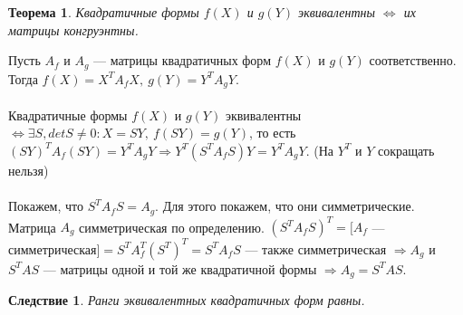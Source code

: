 \newtheorem*{th13_1}{Теорема}\begin{th13_1} Квадратичные формы
	$f(X)$ и $g(Y)$ эквивалентны $\Longleftrightarrow$ их матрицы конгруэнтны.
\end{th13_1}
\begin{Proof} Пусть $A_f$ и $A_g$ --- матрицы квадратичных форм $f(X)$ и $g(Y)$ соответственно. Тогда $f(X) = X^T A_f X,\ g(Y) = Y^T A_g Y.$ \\\\Квадратичные формы $f(X)$ и $g(Y)$ эквивалентны $\Longleftrightarrow \exists S, detS\ne0: X = SY,\ f(SY) = g(Y)$, то есть $(SY)^T A_f (SY) = Y^T A_g Y \Rightarrow Y^T(S^T A_f S) Y = Y^T A_g Y.$ (На $Y^T$ и $Y$ сокращать нельзя)\\\\
	Покажем, что $S^T A_f S = A_g$. Для этого покажем, что они симметрические. Матрица $A_g$ симметрическая по определению. $(S^T A_f S)^T = [A_f$ --- симметрическая$] = S^T A^T_f(S^T)^T = S^T A_f S$ --- также симметрическая $\Rightarrow A_g$ и $S^T A S$ --- матрицы одной и той же квадратичной формы $\Rightarrow  A_g=S^T A S$.
\end{Proof}
\newtheorem*{cor13_1}{Следствие}\begin{cor13_1}Ранги эквивалентных квадратичных форм равны.
\end{cor13_1}








